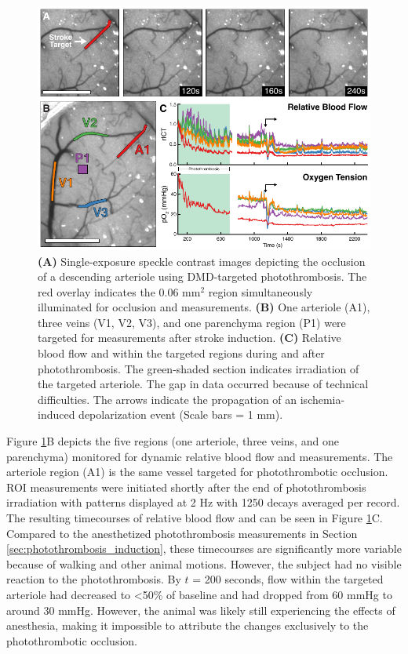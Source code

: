 \begin{figure}
    \includegraphics{figures/chapter_5/acuteawakephotothrombosis.pdf}
    \caption{
        \label{fig:acuteawakephotothrombosis}
        \textbf{(A)} Single-exposure speckle contrast images depicting the occlusion of a descending arteriole using DMD-targeted photothrombosis. The red overlay indicates the 0.06 mm$^2$ region simultaneously illuminated for occlusion and  measurements. \textbf{(B)} One arteriole (A1), three veins (V1, V2, V3), and one parenchyma region (P1) were targeted for  measurements after stroke induction. \textbf{(C)} Relative blood flow and  within the targeted regions during and after photothrombosis. The green-shaded section indicates irradiation of the targeted arteriole. The gap in data occurred because of technical difficulties. The arrows indicate the propagation of an ischemia-induced depolarization event (Scale bars = 1 mm).
    }
\end{figure}

Figure \ref{fig:acuteawakephotothrombosis}B depicts the five regions (one arteriole, three veins, and one parenchyma) monitored for dynamic relative blood flow and  measurements. The arteriole region (A1) is the same vessel targeted for photothrombotic occlusion. ROI  measurements were initiated shortly after the end of photothrombosis irradiation with patterns displayed at 2 Hz with 1250 decays averaged per record. The resulting timecourses of relative blood flow and  can be seen in Figure \ref{fig:acuteawakephotothrombosis}C. Compared to the anesthetized photothrombosis measurements in Section \ref{sec:photothrombosis_induction}, these timecourses are significantly more variable because of walking and other animal motions. However, the subject had no visible reaction to the photothrombosis. By $t$ = 200 seconds, flow within the targeted arteriole had decreased to \textless50\% of baseline and  had dropped from 60 mmHg to around 30 mmHg. However, the animal was likely still experiencing the effects of anesthesia, making it impossible to attribute the changes exclusively to the photothrombotic occlusion.

